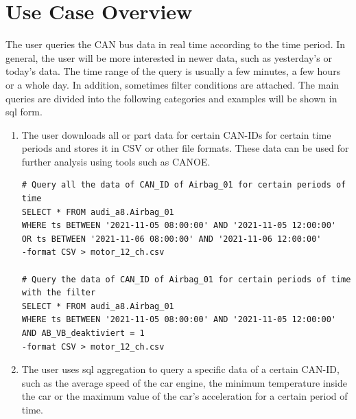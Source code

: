 \section{Use Case Overview}
The user queries the CAN bus data in real time according to the time period. In general, the user will be more interested in newer data, such as yesterday's or today's data. The time range of the query is usually a few minutes, a few hours or a whole day. In addition,  sometimes filter conditions are attached. The main queries are divided into the following categories and examples will be shown in \ac{sql} form.

\begin{enumerate}
    \item The user downloads all or part data for certain CAN-IDs for certain time periods and stores it in CSV or other file formats. These data can be used for further analysis using tools such as CANOE. 
    
    
    \begin{verbatim}
# Query all the data of CAN_ID of Airbag_01 for certain periods of time
SELECT * FROM audi_a8.Airbag_01 
WHERE ts BETWEEN '2021-11-05 08:00:00' AND '2021-11-05 12:00:00' 
OR ts BETWEEN '2021-11-06 08:00:00' AND '2021-11-06 12:00:00'
-format CSV > motor_12_ch.csv

# Query the data of CAN_ID of Airbag_01 for certain periods of time with the filter
SELECT * FROM audi_a8.Airbag_01
WHERE ts BETWEEN '2021-11-05 08:00:00' AND '2021-11-05 12:00:00'
AND AB_VB_deaktiviert = 1
-format CSV > motor_12_ch.csv
\end{verbatim}
    
    \item The user uses \ac{sql} aggregation to query a specific data of a certain CAN-ID, such as the average speed of the car engine, the minimum temperature inside the car or the maximum value of the car's acceleration for a certain period of time. 
    

\end{enumerate}
